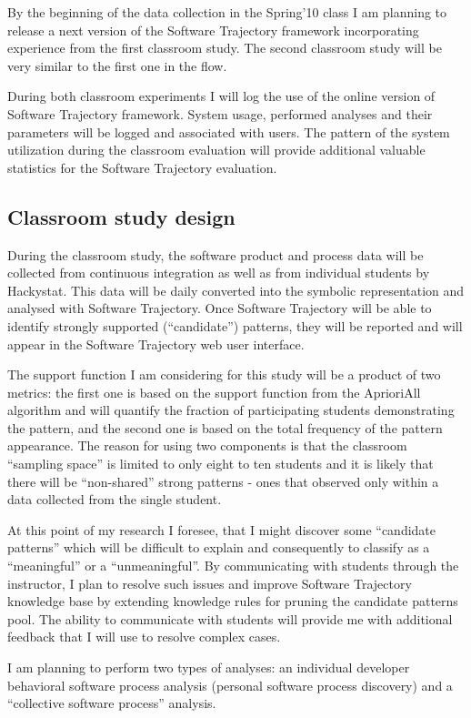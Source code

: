 By the beginning of the data collection in the Spring'10 class I am planning to release a next version of the Software Trajectory framework incorporating experience from the first classroom study. The second classroom study will be very similar to the first one in the flow. 

During both classroom experiments I will log the use of the online version of Software Trajectory framework. System usage, performed analyses and their parameters will be logged and associated with users. The pattern of the system utilization during the classroom evaluation will provide additional valuable statistics for the Software Trajectory evaluation.

\subsection{Classroom study design}
During the classroom study, the software product and process data will be collected from continuous integration as well as from individual students by Hackystat. This data will be daily converted into the symbolic representation and analysed with Software Trajectory. Once Software Trajectory will be able to identify strongly supported (``candidate'') patterns, they will be reported and will appear in the Software Trajectory web user interface.

The support function I am considering for this study will be a product of two metrics: the first one is based on the support function from the AprioriAll algorithm and will quantify the fraction of participating students demonstrating the pattern, and the second one is based on the total frequency of the pattern appearance. The reason for using two components is that the classroom ``sampling space'' is limited to only eight to ten students and it is likely that there will be ``non-shared'' strong patterns - ones that observed only within a data collected from the single student.

At this point of my research I foresee, that I might discover some ``candidate patterns'' which will be difficult to explain and consequently to classify as a ``meaningful'' or a ``unmeaningful''. By communicating with students through the instructor, I plan to resolve such issues and improve Software Trajectory knowledge base by extending knowledge rules for pruning the candidate patterns pool. The ability to communicate with students will provide me with additional feedback that I will use to resolve complex cases.

I am planning to perform two types of analyses: an individual developer behavioral software process analysis (personal software process discovery) and a ``collective software process'' analysis.

